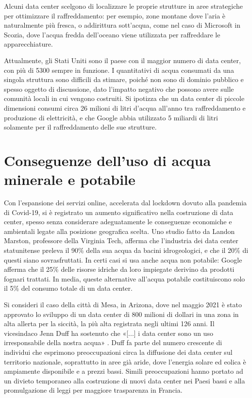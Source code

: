 \documentclass[12pt,a4paper,oneside]{book}
\begin{document}
Alcuni data center scelgono di localizzare le proprie strutture in aree strategiche per ottimizzare il raffreddamento: per esempio, zone montane dove l'aria è naturalmente più fresca, o addirittura sott'acqua, come nel caso di Microsoft in Scozia, dove l'acqua fredda dell'oceano viene utilizzata per raffreddare le apparecchiature.

Attualmente, gli Stati Uniti sono il paese con il maggior numero di data center, con più di 5300 sempre in funzione. I quantitativi di acqua consumati da una singola struttura sono difficili da stimare, poiché non sono di dominio pubblico e spesso oggetto di discussione, dato l'impatto negativo che possono avere sulle comunità locali in cui vengono costruiti. Si ipotizza che un data center di piccole dimensioni consumi circa 26 milioni di litri d'acqua all'anno tra raffreddamento e produzione di elettricità, e che Google abbia utilizzato 5 miliardi di litri solamente per il raffreddamento delle sue strutture.

\section{Conseguenze dell'uso di acqua minerale e potabile}

Con l'espansione dei servizi online, accelerata dal lockdown dovuto alla pandemia di Covid-19, si è registrato un aumento significativo nella costruzione di data center, spesso senza considerare adeguatamente le conseguenze economiche e ambientali legate alla posizione geografica scelta.
Uno studio fatto da Landon Marston, professore della Virginia Tech, afferma che l'industria dei data center statunitense preleva il 90\% della sua acqua da bacini idrogeologici, e che il 20\% di questi siano sovrasfruttati. In certi casi si usa anche acqua non potabile: Google afferma che il 25\% delle risorse idriche da loro impiegate derivino da prodotti fognari trattati. In media, queste alternative all'acqua potabile costituiscono solo il 5\% del consumo totale di un data center. 

Si consideri il caso della città di Mesa, in Arizona, dove nel maggio 2021 è stato approvato lo sviluppo di un data center di 800 milioni di dollari in una zona in alta allerta per la siccità, la più alta registrata negli ultimi 126 anni. Il vicesindaco Jenn Duff ha sostenuto che «[...] i data center sono un uso irresponsabile della nostra acqua» \cite{nbc2021drought}. Duff fa parte del numero crescente di individui che esprimono preoccupazioni circa la diffusione dei data center sul territorio nazionale, soprattutto in aree già aride, dove l'energia solare ed eolica è ampiamente disponibile e a prezzi bassi. 
Simili preoccupazioni hanno portato ad un divieto temporaneo alla costruzione di nuovi data center nei Paesi bassi e alla promulgazione di leggi per maggiore trasparenza in Francia.
\end{document}
